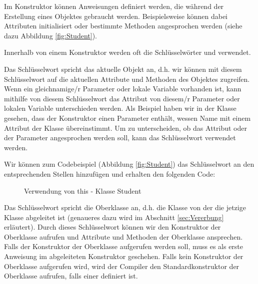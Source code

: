 \documentclass{tuda-pub}
\begin{document}
  Im Konstruktor können Anweisungen definiert werden, die während der Erstellung eines Objektes
  gebraucht werden. Beispielsweise können dabei Attributen initialisiert oder bestimmte Methoden
  angesprochen werden (siehe dazu Abbildung \ref{fig:Student}).

  \br

  Innerhalb von einem Konstruktor werden oft die Schlüsselwörter  und
   verwendet.

  \br

  Das Schlüsselwort  spricht das aktuelle Objekt an, d.h. wir können mit diesem
  Schlüsselwort auf die aktuellen Attribute und Methoden des Objektes zugreifen. Wenn ein
  gleichnamige/r Parameter oder lokale Variable vorhanden ist, kann mithilfe von diesem
  Schlüsselwort das Attribut von diesem/r Parameter oder lokalen Variable unterschieden werden.
  Als Beispiel haben wir in der Klasse  gesehen, dass der Konstruktor einen
  Parameter enthält, wessen Name mit einem Attribut der Klasse übereinstimmt. Um zu
  unterscheiden, ob das Attribut oder der Parameter angesprochen werden soll, kann das
  Schlüsselwort  verwendet werden.

  \br

  Wir können zum Codebeispiel  (Abbildung \ref{fig:Student}) das
  Schlüsselwort  an den entsprechenden Stellen hinzufügen und erhalten den
  folgenden Code:

  \begin{figure}[h]
    \centering
    
    \caption{Verwendung von this - Klasse Student}
  \end{figure}

  Das Schlüsselwort  spricht die Oberklasse an, d.h. die Klasse von der die
  jetzige Klasse abgeleitet ist (genaueres dazu wird im Abschnitt \ref{sec:Vererbung} erläutert).
  Durch dieses Schlüsselwort können wir den Konstruktor der Oberklasse aufrufen und Attribute und
  Methoden der Oberklasse ansprechen. Falls der Konstruktor der Oberklasse aufgerufen werden
  soll, muss es als erste Anweisung im abgeleiteten Konstruktor geschehen. Falls kein Konstruktor
  der Oberklasse aufgerufen wird, wird der Compiler den Standardkonstruktor der Oberklasse
  aufrufen, falls einer definiert ist.

  \clearpage
\end{document}
